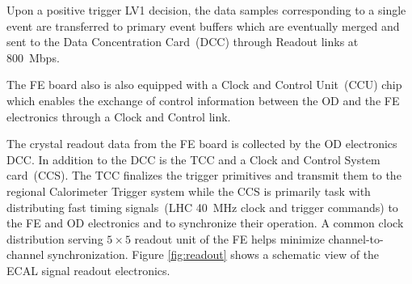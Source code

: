 Upon a positive trigger LV1 decision, the data samples corresponding to a single event are transferred to primary event buffers which are eventually merged and sent to the Data Concentration Card~(DCC) through Readout links at 800~Mbps.
\par
The FE board also is also equipped with a Clock and Control Unit~(CCU) chip which enables the exchange of control information between the OD and the FE electronics through a Clock and Control link.
\par 
The crystal readout data from the FE board is collected by the OD electronics DCC.
In addition to the DCC is the TCC and a Clock and Control System card~(CCS). The TCC finalizes the trigger primitives and transmit them to the regional Calorimeter Trigger system while the CCS is primarily task with distributing fast timing signals~(LHC 40~MHz clock and trigger commands) to the FE and OD electronics and to synchronize their operation. 
A common clock distribution serving $5\times5$ readout unit of the FE helps minimize channel-to-channel synchronization.
Figure \ref{fig:readout} shows a schematic view of the ECAL signal readout electronics.
